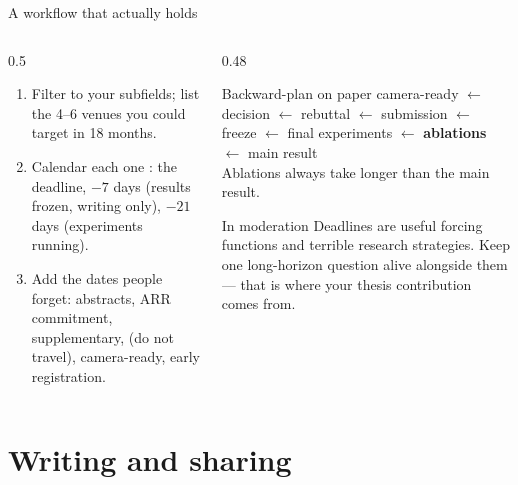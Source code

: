 \documentclass[aspectratio=169,11pt]{beamer}
\begin{document}
\begin{frame}{A workflow that actually holds}
\begin{columns}[T]
\begin{column}{0.5\textwidth}
\begin{enumerate}
  \item Filter to your subfields; list the 4--6 venues you could target in 18
        months.
  \item Calendar each one : the deadline, $-7$ days (results
        frozen, writing only), $-21$ days (experiments running).
  \item Add the dates people forget: abstracts, ARR commitment,
        supplementary,  (do not travel), camera-ready,
        early registration.
\end{enumerate}
\end{column}
\begin{column}{0.48\textwidth}
\begin{block}{Backward-plan on paper}
\footnotesize
camera-ready $\leftarrow$ decision $\leftarrow$ rebuttal $\leftarrow$
submission $\leftarrow$ freeze $\leftarrow$ final experiments $\leftarrow$
\textbf{ablations} $\leftarrow$ main result\\[4pt]
Ablations always take longer than the main result.
\end{block}
\begin{alertblock}{In moderation}
\footnotesize
Deadlines are useful forcing functions and terrible research strategies. Keep
one long-horizon question alive alongside them --- that is where your thesis
contribution comes from.
\end{alertblock}
\end{column}
\end{columns}
\end{frame}

\section{Writing and sharing}
\end{document}
